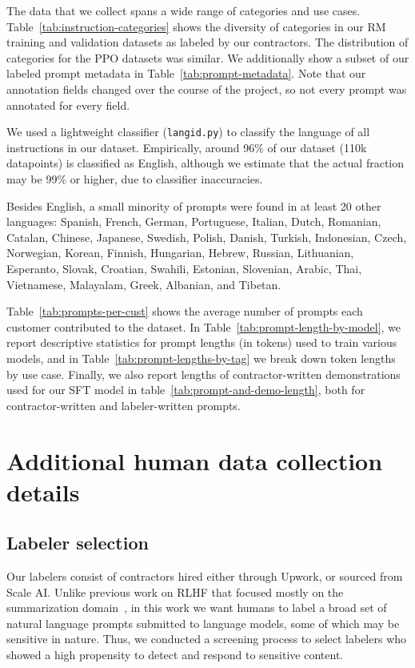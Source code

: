 \documentclass{article}
\begin{document}
The data that we collect spans a wide range of categories and use cases. Table~\ref{tab:instruction-categories} shows the diversity of categories in our RM training and validation datasets as labeled by our contractors. The distribution of categories for the PPO datasets was similar.
We additionally show a subset of our labeled prompt metadata in Table~\ref{tab:prompt-metadata}. 
Note that our annotation fields changed over the course of the project, so not every prompt was annotated for every field.   

We used a lightweight classifier (\texttt{langid.py}) to classify the language of all instructions in our dataset.
Empirically, around 96\% of our dataset (110k datapoints) is classified as English, although we estimate that the actual fraction may be 99\% or higher, due to classifier inaccuracies.

Besides English, a small minority of prompts were found in at least 20 other languages:
Spanish, French, German, Portuguese, Italian, Dutch, Romanian, Catalan, Chinese, Japanese, Swedish, Polish, Danish, Turkish, Indonesian, Czech, Norwegian, Korean, Finnish, Hungarian, Hebrew, Russian, Lithuanian, Esperanto, Slovak, Croatian, Swahili, Estonian, Slovenian, Arabic, Thai, Vietnamese, Malayalam, Greek, Albanian, and Tibetan.

Table~\ref{tab:prompts-per-cust} shows the average number of prompts each customer contributed to the dataset. In Table~\ref{tab:prompt-length-by-model}, we report descriptive statistics for prompt lengths (in tokens) used to train various models, and in Table~\ref{tab:prompt-lengths-by-tag} we  break down token lengths by use case. Finally, we also report lengths of contractor-written demonstrations used for our SFT model in table~\ref{tab:prompt-and-demo-length}, both for contractor-written and labeler-written prompts.

\newpage
\section{Additional human data collection details}
\label{apdx:human-data}

\subsection{Labeler selection}
\label{apdx:human-data:selection}

Our labelers consist of contractors hired either through Upwork, or sourced from Scale AI. Unlike previous work on RLHF that focused mostly on the summarization domain~\cite{ziegler2019fine,stiennon2020learning,wu2021recursively}, in this work we want humans to label a broad set of natural language prompts submitted to language models, some of which may be sensitive in nature. Thus, we conducted a screening process to select labelers who showed a high propensity to detect and respond to sensitive content.
\end{document}
